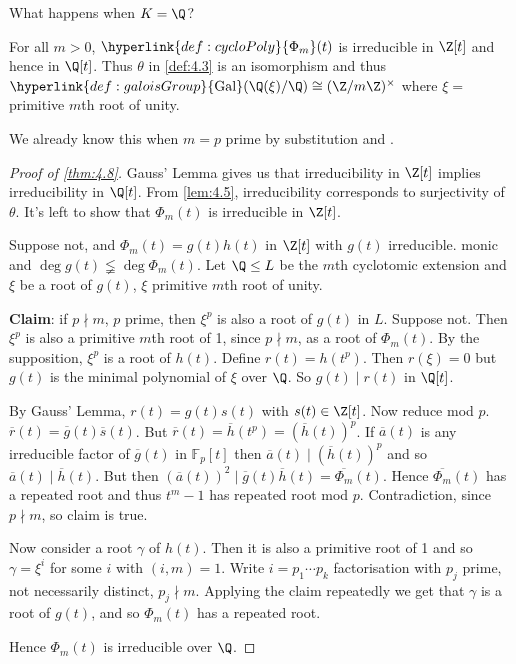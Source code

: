 \documentclass{article}
\DeclareMathOperator{\Gal}{Gal}
\newcommand{\F}{\mathbb{F}}
\begin{document}
What happens when $K = \Q$?
\begin{nthm}\label{thm:4.8}
    For all $m > 0$, $\hyperlink{def:cycloPoly}{\Phi_m}(t)$ is irreducible in $\Z[t]$ and hence in $\Q[t]$.
    Thus $\theta$ in \cref{def:4.3} is an isomorphism and thus $\hyperlink{def:galoisGroup}{\Gal}(\Q(\xi)/\Q) \cong (\Z/m\Z)^\times$ where $\xi =$ primitive $m$th root of unity.
\end{nthm}

\begin{remark}
    We already know this when $m = p$ prime by substitution and .
\end{remark}

\begin{proof}[Proof of \cref{thm:4.8}]
    Gauss' Lemma gives us that irreducibility in $\Z[t]$ implies irreducibility in $\Q[t]$.
    From \cref{lem:4.5}, irreducibility corresponds to surjectivity of $\theta$.
    It's left to show that $\Phi_m(t)$ is irreducible in $\Z[t]$.

    Suppose not, and $\Phi_m(t) = g(t) h(t)$ in $\Z[t]$ with $g(t)$ irreducible. monic and $\deg g(t) \lneqq \deg \Phi_m(t)$.
    Let $\Q \leq L$ be the $m$th cyclotomic extension and $\xi$ be a root of $g(t)$, $\xi$ primitive $m$th root of unity.

    \textbf{Claim}: if $p \nmid m$, $p$ prime, then $\xi^p$ is also a root of $g(t)$ in $L$.
    Suppose not. Then $\xi^p$ is also a primitive $m$th root of 1, since $p \nmid m$, as a root of $\Phi_m(t)$.
    By the supposition, $\xi^p$ is a root of $h(t)$.
    Define $r(t) = h(t^p)$. Then $r(\xi) = 0$ but $g(t)$ is the minimal polynomial of $\xi$ over $\Q$.
    So $g(t) \mid r(t)$ in $\Q[t]$.

    By Gauss' Lemma, $r(t) = g(t) s(t)$ with $s(t) \in \Z[t]$.
    Now reduce mod $p$. $\overline{r}(t) = \overline{g}(t) \overline{s}(t)$.
    But $\overline{r}(t) = \overline{h}(t^p) = (\overline{h}(t))^p$.
    If $\overline{a}(t)$ is any irreducible factor of $\overline{g}(t)$ in $\F_p[t]$ then $\overline{a}(t) \mid (\overline{h}(t))^p$ and so $\overline{a}(t) \mid \overline{h}(t)$.
    But then $(\overline{a}(t))^2 \mid \overline{g}(t) \overline{h}(t) = \overline{\Phi_m}(t)$.
    Hence $\overline{\Phi_m}(t)$ has a repeated root and thus $t^m-1$ has repeated root mod $p$.
    Contradiction, since $p \nmid m$, so claim is true.

    Now consider a root $\gamma$ of $h(t)$.
    Then it is also a primitive root of 1 and so $\gamma = \xi^i$ for some $i$ with $(i, m) = 1$.
    Write $i = p_1 \dotsm p_k$ factorisation with $p_j$ prime, not necessarily distinct, $p_j \nmid m$.
    Applying the claim repeatedly we get that $\gamma$ is a root of $g(t)$, and so $\Phi_m(t)$ has a repeated root.

    Hence $\Phi_m(t)$ is irreducible over $\Q$.
\end{proof}
\end{document}
